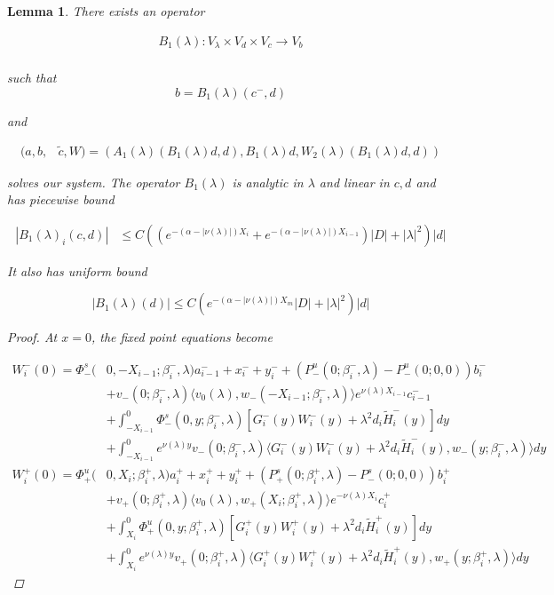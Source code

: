 \documentclass[12pt]{article}
\newtheorem{lemma}{Lemma}
\begin{document}

\begin{lemma}\label{inv3}
There exists an operator

\begin{align*}
B_1(\lambda): V_\lambda \times V_d \times V_c \rightarrow V_b \\
\end{align*}

such that 
\[
b = B_1(\lambda)(c^-, d)
\]

and

\begin{align*}
(a,b,&\tilde{c}, W) 
= (A_1(\lambda)(B_1(\lambda)d, d), B_1(\lambda)d, W_2(\lambda)(B_1(\lambda)d, d))
\end{align*}

solves our system. The operator $B_1(\lambda)$ is analytic in $\lambda$ and linear in $c, d$ and has piecewise bound

\begin{align*}
|B_1(\lambda)_i(c, d)| &\leq C ( (e^{-(\alpha - |\nu(\lambda)|) X_i} + e^{-(\alpha - |\nu(\lambda)|) X_{i-1}} ) |D| + |\lambda|^2 )|d|
\end{align*}

It also has uniform bound

\begin{equation}
|B_1(\lambda)(d)| \leq C ( e^{-(\alpha - |\nu(\lambda)|) X_m} |D| + |\lambda|^2 )|d|
\end{equation}

\begin{proof}

At $x = 0$, the fixed point equations become

\begin{align*}
W_i^-(0) = \Phi^s_-(&0, -X_{i-1}; \beta_i^-, \lambda)a_{i-1}^- + x_i^- + y_i^- + (P^u_-(0; \beta_i^-, \lambda) - P^u_-(0; 0, 0))b_i^- \\
&+ v_-(0; \beta_i^-, \lambda) \langle v_0(\lambda), w_-(-X_{i-1}; \beta_i^-, \lambda) \rangle e^{\nu(\lambda)X_{i-1}} c_{i-1}^- \\
&+ \int_{-X_{i-1}}^0 \Phi^s_-(0, y; \beta_i^-, \lambda) [ G_i^-(y)W_i^-(y) + \lambda^2 d_i \tilde{H}_i^-(y) ] dy \\
&+ \int_{-X_{i-1}}^0
e^{\nu(\lambda)y} v_-(0; \beta_i^-, \lambda) \langle G_i^-(y)W_i^-(y) + \lambda^2 d_i \tilde{H}_i^-(y), w_-(y; \beta_i^-, \lambda) \rangle dy \\
W_i^+(0) = \Phi^u_+(&0, X_i; \beta_i^+, \lambda)a_i^+ + x_i^+ + y_i^+ + (P^s_+(0; \beta_i^+, \lambda) - P^s_-(0; 0, 0))b_i^+ \\
&+ v_+(0; \beta_i^+, \lambda) \langle v_0(\lambda), w_+(X_i; \beta_i^+, \lambda) \rangle e^{-\nu(\lambda) X_i} c_i^+ \\
&+ \int_{X_i}^0 \Phi^u_+(0, y; \beta_i^+, \lambda) [ G_i^+(y)W_i^+(y) + \lambda^2 d_i \tilde{H}_i^+(y) ] dy \\
&+ \int_{X_i}^0 e^{\nu(\lambda)y} v_+(0; \beta_i^+, \lambda) \langle G_i^+(y)W_i^+(y) + \lambda^2 d_i \tilde{H}_i^+(y), w_+(y; \beta_i^+, \lambda) \rangle dy
\end{align*}


\end{proof}
\end{lemma}
\end{document}
